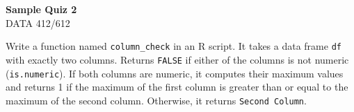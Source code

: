 \documentclass[11pt]{article}
\begin{document}
\begin{center}
{\LARGE\bfseries Sample Quiz 2}\\[0.35em]
DATA 412/612
\end{center}

\vspace{1em}

Write a function named \texttt{column\_check} in an R script. It takes a data frame \texttt{df} with exactly two columns.
Returns \texttt{FALSE} if either of the columns is not numeric (\texttt{is.numeric}). If both columns are numeric, it
computes their maximum values and returns 1 if the maximum of the first column is greater than or equal
to the maximum of the second column. Otherwise, it returns \texttt{Second Column}.
\end{document}
